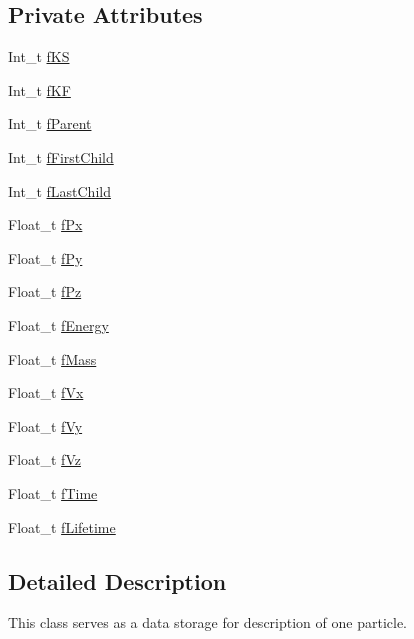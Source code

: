 \subsection*{Private Attributes}
\begin{DoxyCompactItemize}
\item 
Int\+\_\+t \hyperlink{class_t_m_c_particle_a4723c0e7123fae6b0b84bdbbd062cd8b}{f\+K\+S}
\item 
Int\+\_\+t \hyperlink{class_t_m_c_particle_ab2b9101be1606cb7cd6e971f90f2f165}{f\+K\+F}
\item 
Int\+\_\+t \hyperlink{class_t_m_c_particle_a1bf904b743cd10c9c6bfad2ac16378f5}{f\+Parent}
\item 
Int\+\_\+t \hyperlink{class_t_m_c_particle_a5cbe9e048175cebb55f8a8dceb2c7066}{f\+First\+Child}
\item 
Int\+\_\+t \hyperlink{class_t_m_c_particle_ac456401e8602cd629670fcd3fb60a0cc}{f\+Last\+Child}
\item 
Float\+\_\+t \hyperlink{class_t_m_c_particle_a05997efc89d9638943e5e3dcd6984bba}{f\+Px}
\item 
Float\+\_\+t \hyperlink{class_t_m_c_particle_a60125801ead791e2655647312998973b}{f\+Py}
\item 
Float\+\_\+t \hyperlink{class_t_m_c_particle_a649f63e3ca30a215220f1f39c22cfb3b}{f\+Pz}
\item 
Float\+\_\+t \hyperlink{class_t_m_c_particle_a6aa959c273b44f3f715a1250ecb70557}{f\+Energy}
\item 
Float\+\_\+t \hyperlink{class_t_m_c_particle_aa325a935cf4348e7672f637e3877429a}{f\+Mass}
\item 
Float\+\_\+t \hyperlink{class_t_m_c_particle_ac7ccdd0888ee0a6ab1ab4930ac97dd85}{f\+Vx}
\item 
Float\+\_\+t \hyperlink{class_t_m_c_particle_aee87c1f1cf38d4133fc0fa90f418a279}{f\+Vy}
\item 
Float\+\_\+t \hyperlink{class_t_m_c_particle_a9d284f979bbb272eacc2f9dc2771790a}{f\+Vz}
\item 
Float\+\_\+t \hyperlink{class_t_m_c_particle_a8f6583e38c891057542ebfb07422deac}{f\+Time}
\item 
Float\+\_\+t \hyperlink{class_t_m_c_particle_a016dbdb5aa111f888d899e9573b6acd2}{f\+Lifetime}
\end{DoxyCompactItemize}


\subsection{Detailed Description}
This class serves as a data storage for description of one particle.

